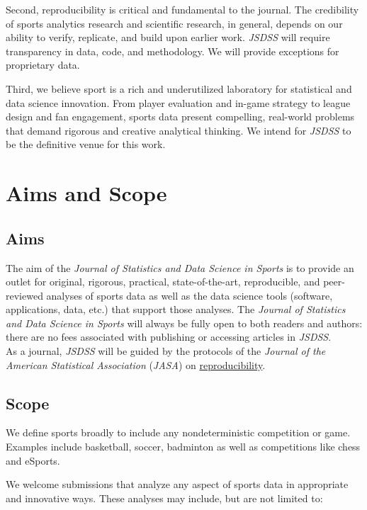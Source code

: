 \documentclass[
  12pt]{article}
\begin{document}
Second, reproducibility is critical and fundamental to the journal. The
credibility of sports analytics research and scientific research, in
general, depends on our ability to verify, replicate, and build upon
earlier work. \emph{JSDSS} will require transparency in data, code, and
methodology. We will provide exceptions for proprietary data.

Third, we believe sport is a rich and underutilized laboratory for
statistical and data science innovation. From player evaluation and
in-game strategy to league design and fan engagement, sports data
present compelling, real-world problems that demand rigorous and
creative analytical thinking. We intend for \emph{JSDSS} to be the
definitive venue for this work.

\section{Aims and Scope}\label{aims-and-scope}

\subsection{Aims}\label{aims}

The aim of the \emph{Journal of Statistics and Data Science in Sports}
is to provide an outlet for original, rigorous, practical,
state-of-the-art, reproducible, and peer-reviewed analyses of sports
data as well as the data science tools (software, applications, data,
etc.) that support those analyses. The \emph{Journal of Statistics and
Data Science in Sports} will always be fully open to both readers and
authors: there are no fees associated with publishing or accessing
articles in \emph{JSDSS}.\\
As a journal, \emph{JSDSS} will be guided by the protocols of the
\emph{Journal of the American Statistical Association} (\emph{JASA}) on
\href{https://magazine.amstat.org/blog/2024/06/03/jasareproducibility/}{reproducibility}.

\subsection{Scope}\label{scope}

We define sports broadly to include any nondeterministic competition or
game. Examples include basketball, soccer, badminton as well as
competitions like chess and eSports.

We welcome submissions that analyze any aspect of sports data in
appropriate and innovative ways. These analyses may include, but are not
limited to:
\end{document}
